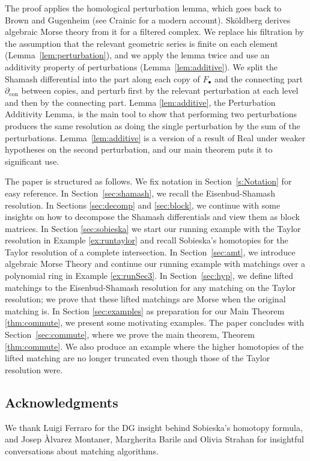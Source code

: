 \documentclass[12pt]{amsart}
\theoremstyle{plain}
\theoremstyle{definition}
\newcommand{\dcon}{\partial_{\mathrm{con}}}
\newcommand{\F}{ {F_\bullet} }
\begin{document}
The proof applies the homological perturbation lemma, which goes back to Brown \cite{Brown1965} and Gugenheim \cite{Gugenheim1972} (see Crainic \cite{Crainic} for a modern account). Sk\"oldberg \cite{SkoldbergHPT} derives algebraic Morse theory from it for a filtered complex. We replace his filtration by the assumption that the relevant geometric series is finite on each element (Lemma~\ref{lem:perturbation}), and we apply the lemma twice and use an additivity property of perturbations (Lemma~\ref{lem:additive}). We split the Shamash differential into the part along each copy of $\F$ and the connecting part $\dcon$ between copies, and perturb first by the relevant perturbation at each level and then by the connecting part. Lemma \ref{lem:additive}, the Perturbation Additivity Lemma, is the main tool to show that performing two perturbations produces the same resolution as doing the single perturbation by the sum of the perturbations. Lemma~\ref{lem:additive} is a version of a result of Real \cite[Proposition~3.6]{Real2000} under weaker hypotheses on the second perturbation, and our main theorem puts it to significant use. 

The paper is structured as follows. We fix notation in Section~\ref{s:Notation} for easy reference.
In Section~\ref{sec:shamash}, we recall the Eisenbud-Shamash resolution. In Sections \ref{sec:decomp} and \ref{sec:block}, we continue with some insights on how to decompose the Shamash differentials and view them as block matrices. In Section \ref{sec:sobieska} we start our running example with the Taylor resolution in Example \ref{ex:runtaylor} and recall Sobieska's homotopies for the Taylor resolution of a complete intersection.
In Section~\ref{sec:amt}, we introduce algebraic Morse Theory and continue our running example with matchings over a polynomial ring in Example \ref{ex:runSec3}. In Section~\ref{sec:hyp}, we define lifted matchings to the Eisenbud-Shamash resolution for any matching on the Taylor resolution; we prove that these lifted matchings are Morse when the original matching is. In Section \ref{sec:examples} as preparation for our Main Theorem \ref{thm:commute}, we present some motivating examples. The paper concludes with Section~\ref{sec:commute}, where we prove the main theorem, Theorem \ref{thm:commute}. We also produce an example where the higher homotopies of the lifted matching are no longer truncated even though those of the Taylor resolution were.

\subsection*{Acknowledgments}
We thank Luigi Ferraro for the DG insight behind Sobieska's homotopy formula, and Josep \`Alvarez Montaner, Margherita Barile and Olivia Strahan for insightful conversations about matching algorithms.
\end{document}
